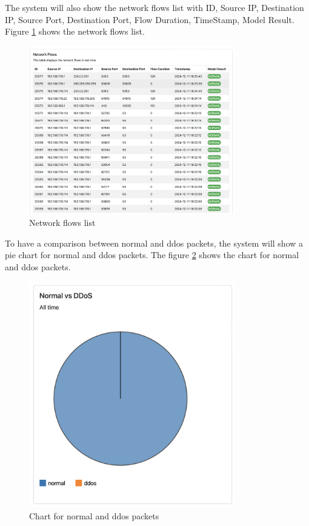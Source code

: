 The system will also show the network flows list with ID, Source IP, Destination IP, Source Port, Destination Port, Flow Duration, TimeStamp, Model Result. Figure \ref{fig:network-flows} shows the network flows list.
\begin{figure}[H]
    \centering
    \includegraphics[width=0.8\textwidth]{../images/network-flows.png}
    \caption{Network flows list}
    \label{fig:network-flows}
\end{figure}
To have a comparison between normal and ddos packets, the system will show a pie chart for normal and ddos packets. The figure \ref{fig:normalDDOs} shows the chart for normal and ddos packets.
\begin{figure}[H]
    \centering
    \includegraphics[width=0.8\textwidth]{../images/packatecomparison.png}
    \caption{Chart for normal and ddos packets}
    \label{fig:normalDDOs}
\end{figure}

